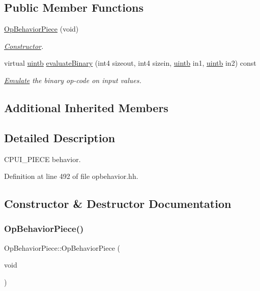 \subsection*{Public Member Functions}
\begin{DoxyCompactItemize}
\item 
\mbox{\hyperlink{class_op_behavior_piece_a484fa78c488ebdf4fee84c467c59f803}{Op\+Behavior\+Piece}} (void)
\begin{DoxyCompactList}\small\item\em \mbox{\hyperlink{class_constructor}{Constructor}}. \end{DoxyCompactList}\item 
virtual \mbox{\hyperlink{types_8h_a2db313c5d32a12b01d26ac9b3bca178f}{uintb}} \mbox{\hyperlink{class_op_behavior_piece_a9c4c67d2abae3beb40c46a6dead82821}{evaluate\+Binary}} (int4 sizeout, int4 sizein, \mbox{\hyperlink{types_8h_a2db313c5d32a12b01d26ac9b3bca178f}{uintb}} in1, \mbox{\hyperlink{types_8h_a2db313c5d32a12b01d26ac9b3bca178f}{uintb}} in2) const
\begin{DoxyCompactList}\small\item\em \mbox{\hyperlink{class_emulate}{Emulate}} the binary op-\/code on input values. \end{DoxyCompactList}\end{DoxyCompactItemize}
\subsection*{Additional Inherited Members}


\subsection{Detailed Description}
C\+P\+U\+I\+\_\+\+P\+I\+E\+CE behavior. 

Definition at line 492 of file opbehavior.\+hh.



\subsection{Constructor \& Destructor Documentation}
\mbox{\label{class_op_behavior_piece_a484fa78c488ebdf4fee84c467c59f803}} 
\subsubsection{\texorpdfstring{OpBehaviorPiece()}{OpBehaviorPiece()}}
{\footnotesize\ttfamily Op\+Behavior\+Piece\+::\+Op\+Behavior\+Piece (\begin{DoxyParamCaption}\item[{void}]{ }\end{DoxyParamCaption})\hspace{0.3cm}{\ttfamily [inline]}}



